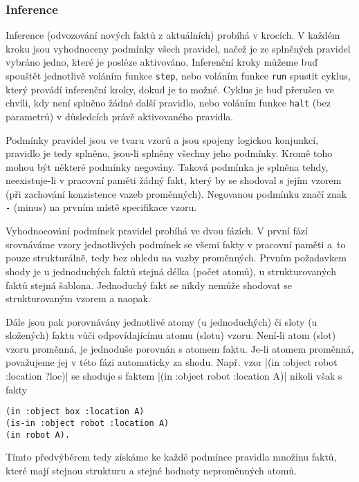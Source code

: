 \subsubsection{Inference}
\label{inference}

Inference (odvozování nových faktů z aktuálních) probíhá v krocích. V každém
kroku jsou vyhodnoceny podmínky všech pravidel, načež je ze splněných pravidel
vybráno jedno, které je posléze aktivováno. Inferenční kroky můžeme buď spouštět
jednotlivě voláním funkce \verb|step|, nebo voláním funkce \verb|run| spustit
cyklus, který provádí inferenční kroky, dokud je to možné. Cyklus je buď
přerušen ve chvíli, kdy není splněno žádné další pravidlo, nebo voláním funkce
\verb|halt| (bez parametrů) v důsledcích právě aktivovaného pravidla.

Podmínky pravidel jsou ve tvaru vzorů a jsou spojeny logickou konjunkcí,
pravidlo je tedy splněno, jsou-li splněny všechny jeho podmínky. Kromě
toho mohou být některé podmínky negovány. Taková podmínka je splněna tehdy,
neexistuje-li v pracovní paměti žádný fakt, který by se shodoval s jejím vzorem
(při zachování konzistence vazeb proměnných). Negovanou podmínku značí znak
\verb|-| (minus) na prvním místě specifikace vzoru.

Vyhodnocování podmínek pravidel probíhá ve dvou fázích. V první fází srovnáváme
vzory jednotlivých podmínek se všemi fakty v pracovní paměti a~to pouze
strukturálně, tedy bez ohledu na vazby proměnných. Prvním požadavkem shody je u
jednoduchých faktů stejná délka (počet atomů), u strukturovaných faktů stejná
šablona. Jednoduchý fakt se nikdy nemůže shodovat se strukturovaným vzorem a
naopak.

Dále jsou pak porovnávány jednotlivé atomy (u jednoduchých) či
sloty (u složených) faktu vůči odpovídajícímu atomu (slotu) vzoru. Není-li atom
(slot) vzoru proměnná, je jednoduše porovnán s atomem faktu. Je-li atomem
proměnná, považujeme jej v této fázi automaticky za shodu. Např. vzor
\cl|(in :object robot :location ?loc)|
se shoduje s faktem
\cl|(in :object robot :location A)|
nikoli však s fakty
\begin{verbatim}
(in :object box :location A)
(is-in :object robot :location A)
(in robot A).
\end{verbatim}
Tímto předvýběrem
tedy získáme ke každé podmínce pravidla množinu faktů, které mají stejnou
strukturu a stejné hodnoty neproměnných atomů.

